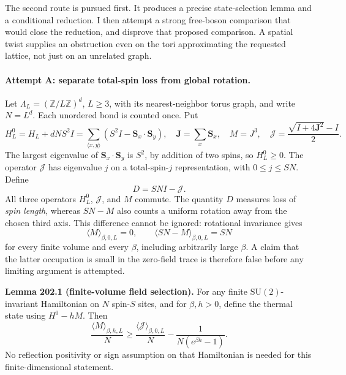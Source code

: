 \documentclass[11pt]{article}
\newcommand{\Z}{\mathbb{Z}}
\begin{document}
	The second route is pursued first. It produces a precise state-selection
	lemma and a conditional reduction. I then attempt a strong free-boson
	comparison that would close the reduction, and disprove that proposed
	comparison. A spatial twist supplies an obstruction even on the tori
	approximating the requested lattice, not just on an unrelated graph.
	
	\paragraph{Attempt A: separate total-spin loss from global rotation.}
	Let $\Lambda_L=(\Z/L\Z)^d$, $L\geq3$, with its nearest-neighbor torus
	graph, and write $N=L^d$. Each unordered bond is counted once. Put
	\begin{equation}\label{statement:operators}
		H^0_L=H_L+dNS^2I
		=\sum_{\langle x,y\rangle}(S^2I-\mathbf S_x\cdot\mathbf S_y),
		\quad \mathbf J=\sum_x\mathbf S_x,\quad M=J^3,
		\quad \mathcal J=\frac{\sqrt{I+4\mathbf J^2}-I}{2}.
	\end{equation}
	The largest eigenvalue of $\mathbf S_x\cdot\mathbf S_y$ is $S^2$,
	by addition of two spins, so $H^0_L\geq0$. The operator $\mathcal J$
	has eigenvalue $j$ on a total-spin-$j$ representation, with
	$0\leq j\leq SN$. Define
	\[
	D=SN I-\mathcal J.
	\]
	All three operators $H^0_L$, $\mathcal J$, and $M$ commute. The
	quantity $D$ measures loss of \emph{spin length}, whereas $SN-M$ also
	counts a uniform rotation away from the chosen third axis. This
	difference cannot be ignored: rotational invariance gives
	\begin{equation}\label{statement:zeromode}
		\langle M\rangle_{\beta,0,L}=0,
		\qquad \langle SN-M\rangle_{\beta,0,L}=SN
	\end{equation}
	for every finite volume and every $\beta$, including arbitrarily large
	$\beta$. A claim that the latter occupation is small in the zero-field
	trace is therefore false before any limiting argument is attempted.
	
	\textbf{Lemma 202.1 (finite-volume field selection).}
	For any finite $\mathrm{SU}(2)$-invariant Hamiltonian on $N$ spin-$S$
	sites, and for $\beta,h>0$, define the thermal state using
	$H^0-hM$. Then
	\begin{equation}\label{statement:selection}
		\frac{\langle M\rangle_{\beta,h,L}}{N}
		\geq \frac{\langle\mathcal J\rangle_{\beta,0,L}}{N}
		-\frac{1}{N(e^{\beta h}-1)}.
	\end{equation}
	No reflection positivity or sign assumption on that Hamiltonian is
	needed for this finite-dimensional statement.
	
\end{document}
